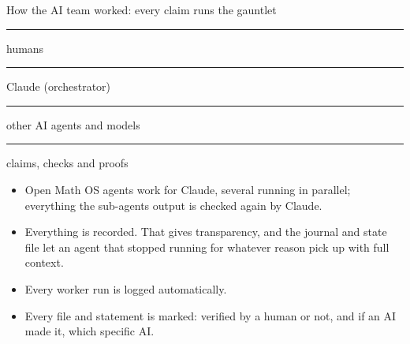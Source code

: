 \documentclass[aspectratio=169,11pt]{beamer}
\begin{document}
\begin{frame}{How the AI team worked: every claim runs the gauntlet}

  \vspace{1pt}
  {\scriptsize
  \textcolor{atomgreen}{\rule{7pt}{7pt}} humans \quad
  \textcolor{symblue}{\rule{7pt}{7pt}} Claude (orchestrator) \quad
  \textcolor{asymorange}{\rule{7pt}{7pt}} other AI agents and models \quad
  \textcolor{gray!45}{\rule{7pt}{7pt}} claims, checks and proofs \par}

  \vspace{3pt}
  \raggedright\scriptsize
  \begin{itemize}\setlength{\itemsep}{0pt}
    \item Open Math OS agents work for Claude, several running in parallel;
      everything the sub-agents output is checked again by Claude.
    \item Everything is recorded. That gives transparency, and the journal and state file
      let an agent that stopped running for whatever reason pick up with full context.
    \item Every worker run is logged automatically.
    \item Every file and statement is marked: verified by a human or not, and if an AI made it,
      which specific AI.
  \end{itemize}
\end{frame}
\end{document}
